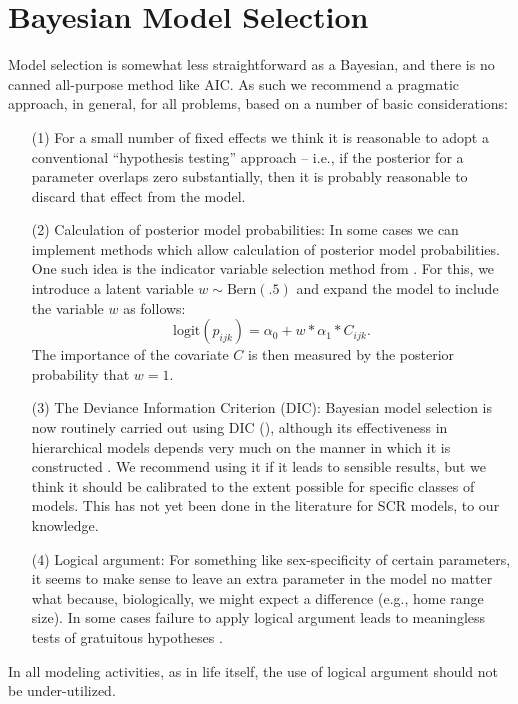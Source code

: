 {\section{Bayesian Model Selection}

Model selection is somewhat less straightforward as a Bayesian, and
there is no canned all-purpose method like AIC. As such we
recommend a pragmatic approach, in general, for all problems,
based on a number of basic considerations:
\begin{itemize}
\item[(1)] For a small number of fixed effects we think it is
  reasonable to adopt a conventional ``hypothesis testing'' approach
  -- i.e., if the posterior for a parameter overlaps zero
  substantially, then it is probably reasonable to discard that
  effect from the model.
\item[(2)] Calculation of posterior model probabilities: In some cases
  we can implement methods which allow calculation of posterior model
  probabilities. One such idea is the indicator variable selection
  method from \citet{kuo_mallick:1998}.  For this, we introduce a latent
  variable $w \sim \mbox{Bern}(.5)$ and expand the model to include
  the variable $w$ as follows:
\[
 \mbox{logit}(p_{ijk}) = \alpha_{0} + w*\alpha_{1}*C_{ijk}.
\]
The importance of the covariate $C$ is then measured by the posterior
probability that $w=1$.
\item[(3)] The Deviance Information Criterion (DIC): Bayesian model
  selection is now routinely carried out using DIC (\citep{spiegelhalter_etal:2002}),
  although its
  effectiveness in hierarchical models depends very much on the manner
  in which it is constructed \citep{millar:2009}.  We recommend using
  it if it leads to sensible results, but we think it should be
  calibrated to the extent possible for specific classes of models.
  This has not yet been done in the literature for SCR models, to our knowledge.
\item[(4)] Logical argument: For something like sex-specificity of
  certain parameters, it seems to make sense to leave an extra
  parameter in the model no matter what because, biologically, we might
 expect a difference (e.g., home range size).
In some cases failure to apply logical argument leads to
  meaningless tests of gratuitous hypotheses \citep{johnson:1999}.
\end{itemize}
In all modeling activities, as in life itself, the use of logical argument should not be under-utilized.

}
